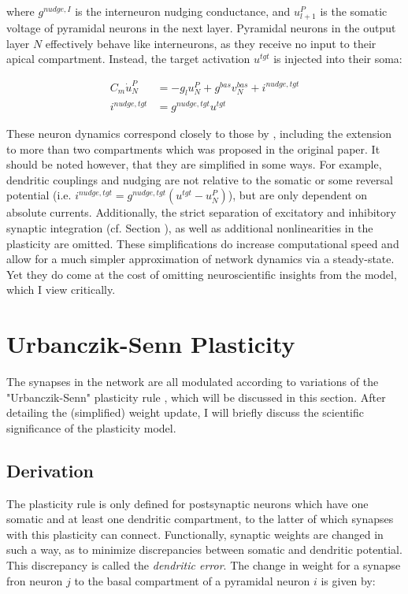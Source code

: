 where $ g^{nudge, I}$ is the interneuron nudging conductance, and $u_{l+1}^P$ is the somatic voltage of pyramidal
neurons in the next layer.  Pyramidal neurons in the output layer $N$ effectively behave like interneurons, as they
receive no input to their apical compartment. Instead, the target  activation $u^{tgt}$ is injected into their soma:

\begin{align}
  C_m \dot{u}_N^P & = - g_l u_N^{P} + g^{bas} v_N^{bas} + i^{nudge, tgt} \\
  i^{nudge, tgt}  & = g^{nudge, tgt} u^{tgt}
\end{align}


These neuron dynamics correspond closely to those by \cite{urbanczik2014learning}, including the extension to more than
two compartments which was proposed in the original paper. It should be noted however, that they are simplified in some
ways. For example, dendritic couplings and nudging are not relative to the somatic or some reversal potential (i.e.
$i^{nudge, tgt}= g^{nudge, tgt} (u^{tgt} - u_N^P )$), but are only dependent on absolute currents. Additionally, the
strict separation of excitatory and inhibitory synaptic integration (cf. Section ), as well as
additional nonlinearities in the plasticity are omitted.  These simplifications do increase computational speed and
allow for a much simpler approximation of network dynamics via a steady-state. Yet they do come at the cost of omitting
neuroscientific insights from the model, which I view critically. \phrasing




\section{Urbanczik-Senn Plasticity}\label{sec-urb-senn-plast}

The synapses in the network are all modulated according to variations of the "Urbanczik-Senn" plasticity rule
\citep{urbanczik2014learning}, which will be discussed in this section. After detailing the (simplified) weight update,
I will briefly discuss the scientific significance of the plasticity model.

\subsection{Derivation}

The plasticity rule is only defined for postsynaptic neurons which have one somatic and at least one dendritic
compartment, to the latter of which synapses with this plasticity can connect. Functionally, synaptic weights are
changed in such a way, as to minimize discrepancies between somatic and dendritic potential. This discrepancy is called
the \textit{dendritic error}. The change in weight for a synapse fron neuron $j$ to the basal compartment of a pyramidal
neuron $i$ is given by:

